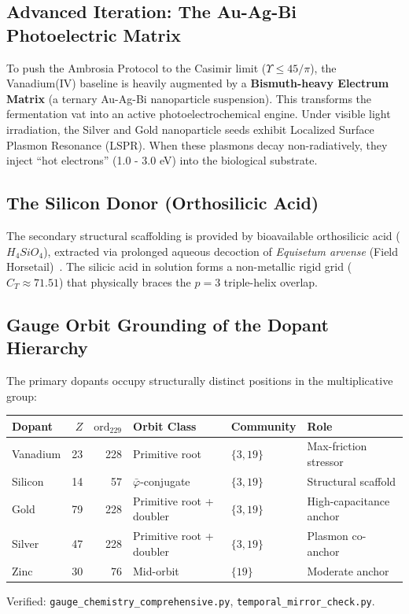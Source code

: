 \subsection{Advanced Iteration: The Au-Ag-Bi Photoelectric Matrix}
To push the Ambrosia Protocol to the Casimir limit ($\Upsilon \le 45/\pi$), the Vanadium(IV) baseline is heavily augmented by a \textbf{Bismuth-heavy Electrum Matrix} (a ternary Au-Ag-Bi nanoparticle suspension). This transforms the fermentation vat into an active photoelectrochemical engine. Under visible light irradiation, the Silver and Gold nanoparticle seeds exhibit Localized Surface Plasmon Resonance (LSPR). When these plasmons decay non-radiatively, they inject ``hot electrons'' (1.0 - 3.0 eV) into the biological substrate.

\subsection{The Silicon Donor (Orthosilicic Acid)}
The secondary structural scaffolding is provided by bioavailable orthosilicic acid ($H_4SiO_4$), extracted via prolonged aqueous decoction of \textit{Equisetum arvense} (Field Horsetail)~\cite{Jugdaohsingh2007Silicon}. The silicic acid in solution forms a non-metallic rigid grid ($C_T \approx 71.51$) that physically braces the $p=3$ triple-helix overlap.

\subsection{Gauge Orbit Grounding of the Dopant Hierarchy}
\begin{result}
The primary dopants occupy structurally distinct positions in the multiplicative group:
\begin{center}
\begin{tabular}{@{}lrrlll@{}}
\toprule
\textbf{Dopant} & $Z$ & $\mathrm{ord}_{229}$ & \textbf{Orbit Class} & \textbf{Community} & \textbf{Role} \\
\midrule
Vanadium & 23 & 228 & Primitive root & $\{3,19\}$ & Max-friction stressor \\
Silicon & 14 & 57 & $\bar\varphi$-conjugate & $\{3,19\}$ & Structural scaffold \\
Gold & 79 & 228 & Primitive root + doubler & $\{3,19\}$ & High-capacitance anchor \\
Silver & 47 & 228 & Primitive root + doubler & $\{3,19\}$ & Plasmon co-anchor \\
Zinc & 30 & 76 & Mid-orbit & $\{19\}$ & Moderate anchor \\
\bottomrule
\end{tabular}
\end{center}
Verified: \texttt{gauge\_chemistry\_comprehensive.py}, \texttt{temporal\_mirror\_check.py}.
\end{result}

